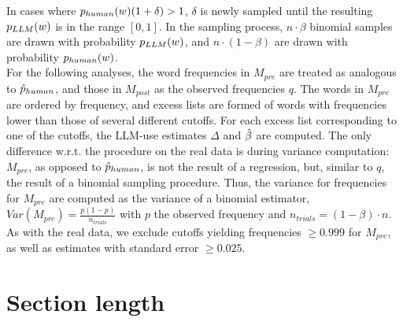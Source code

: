 In cases where $p_{human}(w)(1+\delta)>1$, $\delta$ is newly sampled until the resulting $p_{LLM}(w)$ is in the range $[0,1]$.
In the sampling process, $n\cdot \beta$ binomial samples are drawn with probability $p_{LLM}(w)$, and $n\cdot (1-\beta)$ are drawn with probability $p_{human}(w)$.
\\
For the following analyses, the word frequencies in $M_{pre}$ are treated as analogous to $\hat{p}_{human}$, and those in $M_{post}$ as the observed frequencies $q$.
The words in $M_{pre}$ are ordered by frequency, and excess lists are formed of words with frequencies lower than those of several different cutoffs. 
For each excess list corresponding to one of the cutoffs, the LLM-use estimates $\Delta$ and $\hat{\beta}$ are computed.
The only difference w.r.t. the procedure on the real data is during variance computation: $M_{pre}$, as opposed to $\hat{p}_{human}$, is not the result of a regression, but, similar to $q$, the result of a binomial sampling procedure. 
Thus, the variance for frequencies for $M_{pre}$ are computed as the variance of a binomial estimator, $Var(M_{pre}) = \frac{p(1-p)}{n_{trials}}$ with $p$ the observed frequency and $n_{trials}=(1-\beta)\cdot n$.
As with the real data, we exclude cutoffs yielding frequencies $\ge0.999$ for $M_{pre}$, as well as estimates with standard error $\ge0.025$.


\section{Section length}

